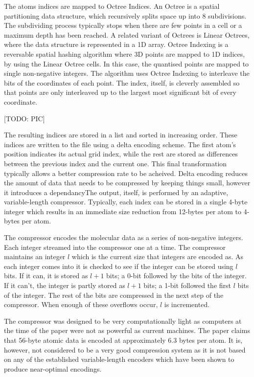 \documentclass[a4paper,11pt]{report}
\begin{document}
The atoms indices are mapped to Octree Indices. An Octree is a spatial partitioning data structure, which recursively splits space up into 8 subdivisions. The subdividing process typically stops when there are few points in a cell or a maximum depth has been reached. A related variant of Octrees is Linear Octrees, where the data structure is represented in a 1D array. Octree Indexing is a reversable spatial hashing algorithm where 3D points are mapped to 1D indices, by using the Linear Octree cells. In this case, the quantised points are mapped to single non-negative integers. The algorithm uses Octree Indexing to interleave the bits of the coordinates of each point. The index, itself, is cleverly assembled so that points are only interleaved up to the largest most significant bit of every coordinate.

[TODO: PIC] 

The resulting indices are stored in a list and sorted in increasing order. These indices are written to the file using a delta encoding scheme. The first atom's position indicates its actual grid index, while the rest are stored as differences between the previous index and the current one. This final transformation typically allows a better compression rate to be acheived. Delta encoding reduces the amount of data that needs to be compressed by keeping things small, however it introduces a dependancyThe output, itself, is performed by an adaptive, variable-length compressor. Typically, each index can be stored in a single 4-byte integer which results in an immediate size reduction from 12-bytes per atom to 4-bytes per atom. 

The compressor encodes the molecular data as a series of non-negative integers. Each integer streamed into the compressor one at a time. The compressor maintains an integer $l$ which is the current size that integers are encoded as. As each integer comes into it is checked to see if the integer can be stored using $l$ bits. If it can, it is stored as $l+1$ bits; a 0-bit followed by the bits of the integer. If it can't, the integer is partly stored as $l+1$ bits; a 1-bit followed the first $l$ bits of the integer. The rest of the bits are compressed in the next step of the compressor. When enough of these overflows occur, $l$ is incremented.

The compressor was designed to be very computationally light as computers at the time of the paper were not as powerful as current machines. The paper claims that 56-byte atomic data is encoded at approximately 6.3 bytes per atom. It is, however, not considered to be a very good compression system as it is not based on any of the established variable-length encoders which have been shown to produce near-optimal encodings.
\end{document}
